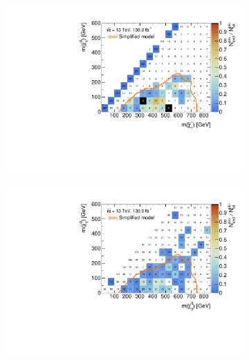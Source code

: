  \begin{figure}
	\centering
	\begin{subfigure}[b]{0.5\linewidth}
		\centering\includegraphics[width=\textwidth]{cut_none/mchi1p_mlsp_contour}
		\caption{\label{fig:mchi1p_mlsp_contour}}
	\end{subfigure}\hfill
	\begin{subfigure}[b]{0.5\linewidth}
		\centering\includegraphics[width=\textwidth]{cut_none/mchi20_mlsp_contour}
		\caption{\label{fig:mchi20_mlsp_contour}}
	\end{subfigure}\hfill
	\begin{subfigure}[b]{0.5\linewidth}

\end{subfigure}
\end{figure}
